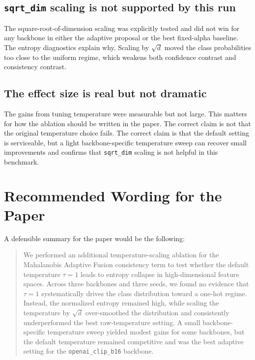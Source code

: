 \documentclass[11pt]{article}
\begin{document}
\subsection{\texttt{sqrt\_dim} scaling is not supported by this run}

The square-root-of-dimension scaling was explicitly tested and did not win for any backbone in either the adaptive proposal or the best fixed-alpha baseline. The entropy diagnostics explain why. Scaling by $\sqrt{d}$ moved the class probabilities too close to the uniform regime, which weakens both confidence contrast and consistency contrast.

\subsection{The effect size is real but not dramatic}

The gains from tuning temperature were measurable but not large. This matters for how the ablation should be written in the paper. The correct claim is not that the original temperature choice fails. The correct claim is that the default setting is serviceable, but a light backbone-specific temperature sweep can recover small improvements and confirms that \texttt{sqrt\_dim} scaling is not helpful in this benchmark.

\section{Recommended Wording for the Paper}

A defensible summary for the paper would be the following:

\begin{quote}
We performed an additional temperature-scaling ablation for the Mahalanobis Adaptive Fusion consistency term to test whether the default temperature $\tau = 1$ leads to entropy collapse in high-dimensional feature spaces. Across three backbones and three seeds, we found no evidence that $\tau = 1$ systematically drives the class distribution toward a one-hot regime. Instead, the normalized entropy remained high, while scaling the temperature by $\sqrt{d}$ over-smoothed the distribution and consistently underperformed the best raw-temperature setting. A small backbone-specific temperature sweep yielded modest gains for some backbones, but the default temperature remained competitive and was the best adaptive setting for the \texttt{openai\_clip\_b16} backbone.
\end{quote}
\end{document}
